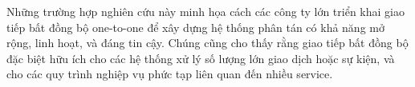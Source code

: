 Những trường hợp nghiên cứu này minh họa cách các công ty lớn triển khai giao tiếp bất đồng bộ one-to-one để xây dựng hệ thống phân tán có khả năng mở rộng, linh hoạt, và đáng tin cậy. Chúng cũng cho thấy rằng giao tiếp bất đồng bộ đặc biệt hữu ích cho các hệ thống xử lý số lượng lớn giao dịch hoặc sự kiện, và cho các quy trình nghiệp vụ phức tạp liên quan đến nhiều service.
